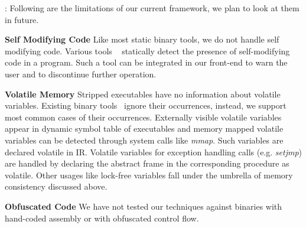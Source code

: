 {\underline{}}: Following are the limitations of our current framework, we plan to look at them in future.
\squishlist
\item \textbf{Self Modifying Code}
Like most static binary tools, we do not handle self modifying code. Various tools ~\cite{smc-still} statically detect the presence of self-modifying code in a program. Such a tool can be integrated in our front-end to warn the user and to discontinue further operation.

\item \textbf{Volatile Memory}
Stripped executables have no information about volatile variables. Existing binary tools~\cite{plto,bruening2004eta,Diablo1,fx32,cifuentes00,atom} ignore their occurrences, instead, we support most common cases of their occurrences. Externally visible volatile variables appear in dynamic symbol table of executables and memory mapped volatile variables can be detected through system calls like \emph{mmap}. Such variables are declared volatile in IR. Volatile variables for exception handling calls (e.g. \emph{setjmp}) are handled by declaring the abstract frame in the corresponding procedure as volatile. Other usages like lock-free variables fall under the umbrella of memory consistency discussed above.

\item \textbf{Obfuscated Code}
We have not tested our techniques against binaries with hand-coded assembly or with obfuscated control flow.

\squishend
